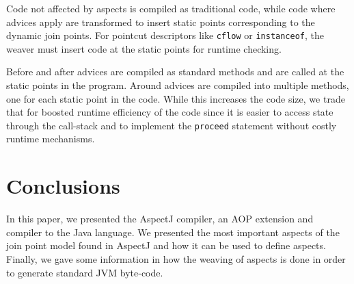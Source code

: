 \documentclass{template}
\begin{document}
Code not affected by aspects is compiled as traditional code, while code where advices apply are
transformed to insert static points corresponding to the dynamic join points.
For pointcut descriptors like \texttt{cflow} or \texttt{instanceof}, the weaver must insert
code at the static points for runtime checking.

Before and after advices are compiled as standard methods and are called at the static points in
the program. Around advices are compiled into multiple methods, one for each static point in the code.
While this increases the code size, we trade that for boosted runtime efficiency of the code since
it is easier to access state through the call-stack and to implement the \texttt{proceed} statement
without costly runtime mechanisms.

\section{Conclusions}

In this paper, we presented the AspectJ compiler, an AOP extension and compiler to the Java language.
We presented the most important aspects of the join point model found in AspectJ and how it can be used
to define aspects. Finally, we gave some information in how the weaving of aspects is done in order to
generate standard JVM byte-code.




\balancecolumns
\end{document}
